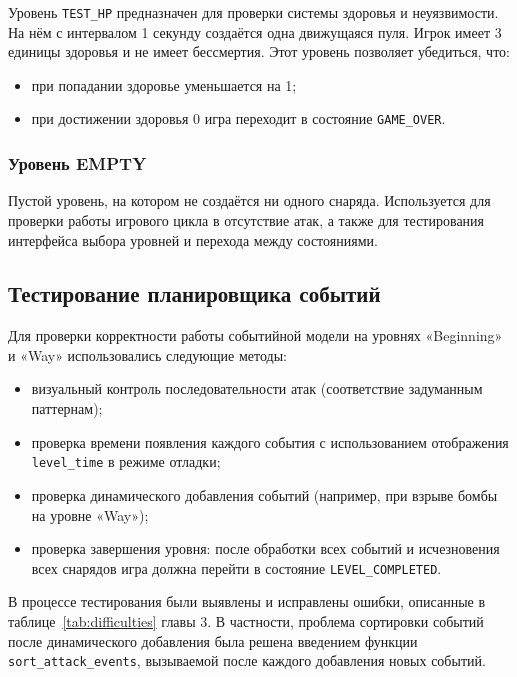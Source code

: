 \documentclass[../main.tex]{subfiles}
\begin{document}
Уровень \texttt{TEST\_HP} предназначен для проверки системы здоровья и неуязвимости. На нём с интервалом 1 секунду создаётся одна движущаяся пуля. Игрок имеет 3 единицы здоровья и не имеет бессмертия. Этот уровень позволяет убедиться, что:
\begin{itemize}
	\item при попадании здоровье уменьшается на 1;
	\item при достижении здоровья 0 игра переходит в состояние \texttt{GAME\_OVER}.
\end{itemize}

\subsubsection{Уровень EMPTY}

Пустой уровень, на котором не создаётся ни одного снаряда. Используется для проверки работы игрового цикла в отсутствие атак, а также для тестирования интерфейса выбора уровней и перехода между состояниями.

\subsection{Тестирование планировщика событий}

Для проверки корректности работы событийной модели на уровнях «Beginning» и «Way» использовались следующие методы:
\begin{itemize}
	\item визуальный контроль последовательности атак (соответствие задуманным паттернам);
	\item проверка времени появления каждого события с использованием отображения \texttt{level\_time} в режиме отладки;
	\item проверка динамического добавления событий (например, при взрыве бомбы на уровне «Way»);
	\item проверка завершения уровня: после обработки всех событий и исчезновения всех снарядов игра должна перейти в состояние \texttt{LEVEL\_COMPLETED}.
\end{itemize}

В процессе тестирования были выявлены и исправлены ошибки, описанные в таблице~\ref{tab:difficulties} главы 3. В частности, проблема сортировки событий после динамического добавления была решена введением функции \texttt{sort\_attack\_events}, вызываемой после каждого добавления новых событий.
\end{document}
